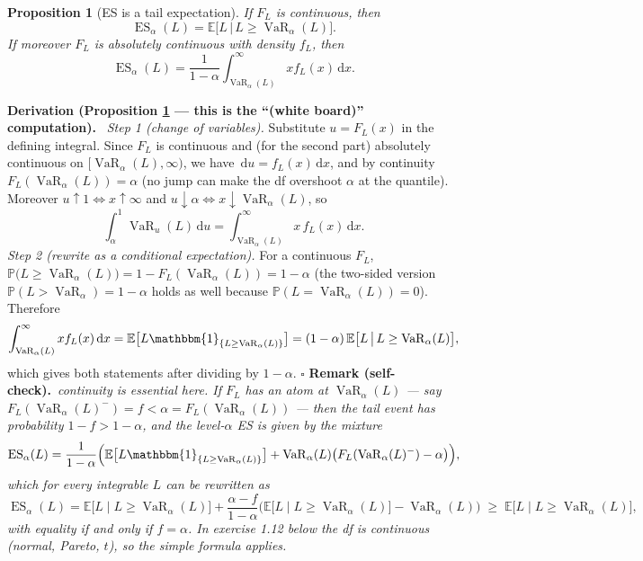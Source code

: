 \documentclass[11pt,a4paper]{article}
\newtheorem{proposition}{Proposition}
\newcommand{\VaR}{\operatorname{VaR}}
\newcommand{\ES}{\operatorname{ES}}
\newcommand{\E}{\mathbb{E}}
\renewcommand{\P}{\mathbb{P}}
\newcommand{\dd}{\,\mathrm{d}}
\newcommand{\ind}[1]{\mathbbm{1}_{\{#1\}}}
\newcommand{\der}[1]{\medskip\noindent\textbf{Derivation (#1).}\ }
\newcommand{\selfcheck}[1]{\medskip\noindent\textbf{Remark (self-check).}\ \textit{#1}}
\begin{document}
\begin{proposition}[ES is a tail expectation]\label{prop:ES-tails}
If $F_L$ is continuous, then
\[
  \ES_\alpha(L)=\E\big[L\,\big|\,L\ge\VaR_\alpha(L)\big].
\]
If moreover $F_L$ is absolutely continuous with density $f_L$, then
\[
  \ES_\alpha(L)=\frac{1}{1-\alpha}\int_{\VaR_\alpha(L)}^{\infty}x f_L(x)\dd x .
\]
\end{proposition}
\der{Proposition \ref{prop:ES-tails} --- this is the ``(white board)'' computation}
\emph{Step 1 (change of variables).} Substitute $u=F_L(x)$ in the defining integral. Since $F_L$ is
continuous and (for the second part) absolutely continuous on $[\VaR_\alpha(L),\infty)$, we have
$\dd u=f_L(x)\dd x$, and by continuity $F_L(\VaR_\alpha(L))=\alpha$ (no jump can make the df overshoot
$\alpha$ at the quantile). Moreover $u\uparrow1\iff x\uparrow\infty$ and $u\downarrow\alpha\iff
x\downarrow\VaR_\alpha(L)$, so
\[
  \int_\alpha^1 \VaR_u(L)\dd u
   =\int_{\VaR_\alpha(L)}^{\infty} x\,f_L(x)\dd x .
\]
\emph{Step 2 (rewrite as a conditional expectation).} For a continuous $F_L$,
$\P\big(L\ge\VaR_\alpha(L)\big)=1-F_L(\VaR_\alpha(L))=1-\alpha$ (the two-sided version
$\P(L>\VaR_\alpha)=1-\alpha$ holds as well because $\P(L=\VaR_\alpha(L))=0$). Therefore
\[
  \int_{\VaR_\alpha(L)}^{\infty}x f_L(x)\dd x
   =\E\big[L\ind{L\ge\VaR_\alpha(L)}\big]
   =(1-\alpha)\,\E\big[L\,\big|\,L\ge\VaR_\alpha(L)\big],
\]
which gives both statements after dividing by $1-\alpha$. \hfill$\square$
\selfcheck{continuity is essential here. If $F_L$ has an atom at $\VaR_\alpha(L)$ --- say
$F_L(\VaR_\alpha(L)^-)=f<\alpha=F_L(\VaR_\alpha(L))$ --- then the tail event has probability
$1-f>1-\alpha$, and the level-$\alpha$ ES is given by the mixture
\[
  \ES_\alpha(L)=\frac{1}{1-\alpha}\Big(\E\big[L\ind{L\ge\VaR_\alpha(L)}\big]
                +\VaR_\alpha(L)\big(F_L(\VaR_\alpha(L)^-)-\alpha\big)\Big),
\]
which for every integrable $L$ can be rewritten as
\[
  \ES_\alpha(L)=\E\big[L\mid L\ge\VaR_\alpha(L)\big]
   +\frac{\alpha-f}{1-\alpha}\Big(\E\big[L\mid L\ge\VaR_\alpha(L)\big]-\VaR_\alpha(L)\Big)
   \;\ge\;\E\big[L\mid L\ge\VaR_\alpha(L)\big],
\]
with equality if and only if $f=\alpha$. In exercise 1.12 below the df is continuous (normal,
Pareto, $t$), so the simple formula applies.}
\end{document}
